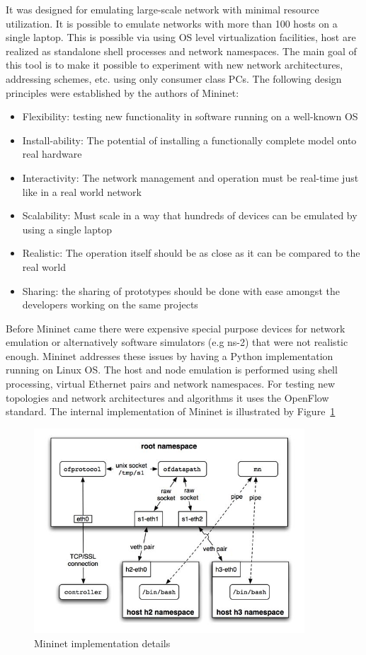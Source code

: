 \documentclass{article}
\begin{document}
It was designed for emulating large-scale network with minimal resource utilization. It is possible to emulate networks with more than 100 hosts on a single laptop. This is possible via using OS level virtualization facilities, host are realized as standalone shell processes and network namespaces. The main goal of this tool is to make it possible to experiment with new network architectures, addressing schemes, etc. using only consumer class PCs. The following design principles were established by the authors of Mininet:
\begin{itemize}
    \item Flexibility: testing new functionality in software running on a well-known OS
    \item Install-ability: The potential of installing a functionally complete model onto real hardware
    \item Interactivity: The network management and operation must be real-time just like in a real world network
    \item Scalability: Must scale in a way that hundreds of devices can be emulated by using a single laptop
    \item Realistic: The operation itself should be as close as it can be compared to the real world
    \item Sharing: the sharing of prototypes should be done with ease amongst the developers working on the same projects
\end{itemize}

Before Mininet came there were expensive special purpose devices for network emulation or alternatively software simulators (e.g ns-2) that were not realistic enough. Mininet addresses these issues by having a Python implementation running on Linux OS. The host and node emulation is performed using shell processing, virtual Ethernet pairs and network namespaces. For testing new topologies and network architectures and algorithms it uses the OpenFlow standard. The internal implementation of Mininet is illustrated by Figure~\ref{fig:Mininet-Impl}

\begin{figure}[!htb]
    \centering
    \includegraphics[width=0.9\textwidth]{figures/mininet_impl.png}
    \caption{Mininet implementation details}
    \label{fig:Mininet-Impl}
\end{figure}
\end{document}
